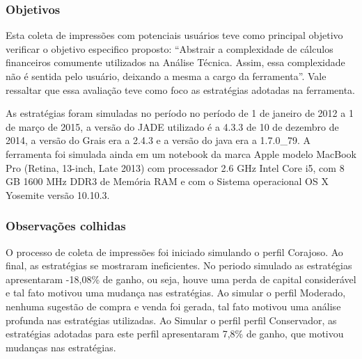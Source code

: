 \subsubsection{Objetivos}

Esta coleta de impressões com potenciais usuários teve como principal objetivo verificar  o objetivo especifico proposto: “Abstrair a complexidade de cálculos financeiros comumente utilizados na Análise Técnica. Assim, essa complexidade não é sentida pelo usuário, deixando a mesma a cargo da ferramenta”. Vale ressaltar que essa avaliação teve como foco as estratégias adotadas na ferramenta.

As estratégias foram simuladas no período no período de 1 de janeiro de 2012 a 1 de março de 2015, a versão do JADE utilizado é a 4.3.3 de 10 de dezembro de 2014, a versão do Grais era a 2.4.3 e a versão do java era a 1.7.0\_79. A ferramenta foi simulada ainda em um notebook da marca Apple modelo MacBook Pro (Retina, 13-inch, Late 2013) com processador 2.6 GHz Intel Core i5, com 8 GB 1600 MHz DDR3 de Memória RAM e com o Sistema operacional OS X Yosemite versão 10.10.3.

\subsubsection{Observações colhidas}

O processo de coleta de impressões foi iniciado simulando o perfil Corajoso. Ao final, as estratégias se mostraram ineficientes. No periodo simulado as estratégias apresentaram -18,08\% de ganho, ou seja, houve uma perda de capital considerável e tal fato motivou uma mudança nas estratégias. Ao simular o perfil Moderado, nenhuma sugestão de compra e venda foi gerada, tal fato motivou uma análise profunda nas estratégias utilizadas. Ao Simular o perfil perfil Conservador, as estratégias adotadas para este perfil apresentaram 7,8\% de ganho, que motivou mudanças nas estratégias.


